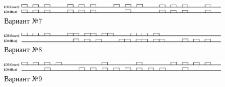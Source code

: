 \begin{figure}[H]
\begin{center}
\includegraphics[scale=0.3]{Image/85.jpg} 
\end{center}
\caption{Вариант №7}
\end{figure}
\begin{figure}[H]
\begin{center}
\includegraphics[scale=0.3]{Image/86.jpg} 
\end{center}
\caption{Вариант №8}
\end{figure}
\begin{figure}[H]
\begin{center}
\includegraphics[scale=0.3]{Image/87.jpg} 
\end{center}
\caption{Вариант №9}
\end{figure}